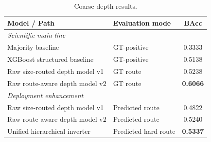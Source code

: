 \begin{table}[t]
\caption{Coarse depth results.}
\label{tab:depth}
\centering
\begin{tabular}{p{}p{}c}
\toprule
Model / Path & Evaluation mode & BAcc \\
\midrule
\multicolumn{3}{l}{\textit{Scientific main line}} \\
Majority baseline & GT-positive & 0.3333 \\
XGBoost structured baseline & GT-positive & 0.5138 \\
Raw size-routed depth model v1 & GT route & 0.5238 \\
Raw route-aware depth model v2 & GT route & \textbf{0.6066} \\
\midrule
\multicolumn{3}{l}{\textit{Deployment enhancement}} \\
Raw size-routed depth model v1 & Predicted route & 0.4822 \\
Raw route-aware depth model v2 & Predicted route & 0.5240 \\
Unified hierarchical inverter & Predicted hard route & \textbf{0.5337} \\
\bottomrule
\end{tabular}
\end{table}
